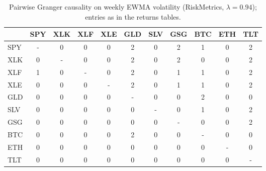 \begin{table}[H]
\centering
\small
\begin{tabular}{lcccccccccc}
\toprule
 & SPY & XLK & XLF & XLE & GLD & SLV & GSG & BTC & ETH & TLT \\
\midrule
SPY & - & 0 & 0 & 0 & 2 & 0 & 2 & 1 & 0 & 2 \\
XLK & 0 & - & 0 & 0 & 2 & 0 & 2 & 0 & 0 & 2 \\
XLF & 1 & 0 & - & 0 & 2 & 0 & 1 & 1 & 0 & 2 \\
XLE & 0 & 0 & 0 & - & 2 & 0 & 1 & 1 & 0 & 2 \\
GLD & 0 & 0 & 0 & 0 & - & 0 & 0 & 2 & 0 & 0 \\
SLV & 0 & 0 & 0 & 0 & 0 & - & 0 & 1 & 0 & 2 \\
GSG & 0 & 0 & 0 & 0 & 0 & 0 & - & 0 & 0 & 2 \\
BTC & 0 & 0 & 0 & 0 & 2 & 0 & 0 & - & 0 & 0 \\
ETH & 0 & 0 & 0 & 0 & 0 & 0 & 0 & 0 & - & 0 \\
TLT & 0 & 0 & 0 & 0 & 0 & 0 & 0 & 0 & 0 & - \\
\bottomrule
\end{tabular}
\caption{Pairwise Granger causality on weekly EWMA volatility (RiskMetrics, $\lambda{=}0.94$); entries as in the returns tables.}
\label{tab:vol_weekly}
\end{table}